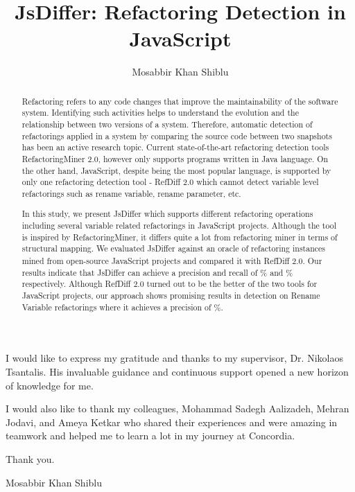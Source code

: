 \documentclass[letterpaper,12pt,onecolumn,final]{report}
\author{Mosabbir Khan Shiblu}
\title{JsDiffer: Refactoring Detection in JavaScript}
\begin{document}
\begin{abstract}
{%

Refactoring refers to any code changes that improve the maintainability of the software system. Identifying such activities helps to understand the evolution and the relationship between two versions of a system. Therefore, automatic detection of refactorings applied in a system by comparing the source code between two snapshots has been an active research topic. Current state-of-the-art refactoring detection tools RefactoringMiner 2.0, however only supports programs written in Java language. On the other hand, JavaScript, despite being the most popular language, is supported by only one refactoring detection tool - RefDiff 2.0 which cannot detect variable level refactorings such as rename variable, rename parameter, etc. 

In this study, we present JsDiffer which supports \textbf{\supportedRefTypesJsDiffer{}} different refactoring operations including several variable related refactorings in JavaScript projects. Although the tool is inspired by RefactoringMiner, it differs quite a lot from refactoring miner in terms of structural mapping. We evaluated JsDiffer against an oracle of \textbf{\oracleValidatedInstances{}} refactoring instances mined from \evTotalProjectCounts{} open-source JavaScript projects and compared it with RefDiff 2.0. Our results indicate that JsDiffer can achieve a precision and recall of \oraclePrecision{}\% and \oracleRecall{}\% respectively. Although  RefDiff 2.0 turned out to be the better of the two tools for JavaScript projects, our approach shows promising results in detection on Rename Variable refactorings where it achieves a precision of  \renameVarPrecision{}\%.

}\end{abstract}


\begin{acknowledgments}

I would like to express my gratitude and thanks to my supervisor, Dr. Nikolaos Tsantalis. His invaluable guidance and continuous support opened a new horizon of knowledge for me.

I would also like to thank my colleagues, Mohammad Sadegh Aalizadeh, Mehran Jodavi, and Ameya Ketkar who shared their experiences and were amazing in teamwork and helped me to learn a lot in my journey at Concordia.

\vspace{5mm}

Thank you.

Mosabbir Khan Shiblu
	
\end{acknowledgments}
\end{document}
